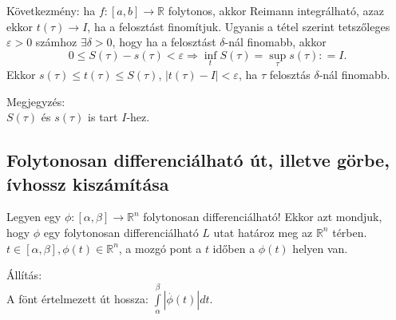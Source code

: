 \documentclass[12pt,a4paper]{scrartcl}
\newenvironment{allitas}{}{}
\newenvironment{megjegyzes}{}{}
\begin{document}
Következmény: ha
\(\left. f:\left\lbrack {a,b} \right\rbrack\rightarrow{\mathbb{R}} \right.\)
folytonos, akkor Reimann integrálható, azaz ekkor
\(\left. t\left( \tau \right)\rightarrow I \right.\), ha a felosztást
finomítjuk. Ugyanis a tétel szerint tetszőleges \(\varepsilon > 0\)
számhoz \(\exists\delta > 0\), hogy ha a felosztást \(\delta\)-nál
finomabb, akkor
\[\left. 0 \leq S\left( \tau \right) - s\left( \tau \right) < \varepsilon\Rightarrow\inf\limits_{t}S\left( \tau \right) = \sup\limits_{\tau}s\left( \tau \right): = I. \right.\]
Ekkor
\(s\left( \tau \right) \leq t\left( \tau \right) \leq S\left( \tau \right)\),
\(\left| {t\left( \tau \right) - I} \right| < \varepsilon\), ha \(\tau\)
felosztás \(\delta\)-nál finomabb.

\begin{megjegyzes}

Megjegyzés:\\
\(S\left( \tau \right)\) és \(s\left( \tau \right)\) is tart \(I\)-hez.

\end{megjegyzes}

\hypertarget{folytonosan-differencialhato-ut-illetve-gorbe-ivhossz-kiszamitasa}{%
\subsection{Folytonosan differenciálható út, illetve görbe, ívhossz
kiszámítása}\label{folytonosan-differencialhato-ut-illetve-gorbe-ivhossz-kiszamitasa}}

Legyen egy
\(\left. \phi:\left\lbrack {\alpha,\beta} \right\rbrack\rightarrow{\mathbb{R}}^{n} \right.\)
folytonosan differenciálható! Ekkor azt mondjuk, hogy \(\phi\) egy
folytonosan differenciálható \(L\) utat határoz meg az
\({\mathbb{R}}^{n}\) térben.
\(t \in \left\lbrack {\alpha,\beta} \right\rbrack,\phi\left( t \right) \in {\mathbb{R}}^{n}\),
a mozgó pont a \(t\) időben a \(\phi\left( t \right)\) helyen van.

\begin{allitas}

Állítás:\\
A fönt értelmezett út hossza:
\(\int\limits_{\alpha}^{\beta}{\left| {\overset{.}{\phi}\left( t \right)} \right|dt}\).

\end{allitas}
\end{document}
